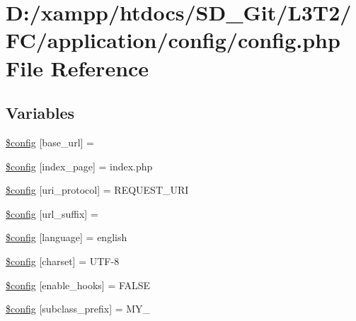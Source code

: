 \hypertarget{application_2config_2config_8php}{}\section{D\+:/xampp/htdocs/\+S\+D\+\_\+\+Git/\+L3\+T2/\+F\+C/application/config/config.php File Reference}
\label{application_2config_2config_8php}
\subsection*{Variables}
\begin{DoxyCompactItemize}
\item 
\hyperlink{application_2config_2config_8php_a8063081991a9d7087e6aea78db95a524}{\$config} \mbox{[}\textquotesingle{}base\+\_\+url\textquotesingle{}\mbox{]} = \textquotesingle{}\textquotesingle{}
\item 
\hyperlink{application_2config_2config_8php_a64d47dc21f6eab24bf747cae9da5e7bb}{\$config} \mbox{[}\textquotesingle{}index\+\_\+page\textquotesingle{}\mbox{]} = \textquotesingle{}index.\+php\textquotesingle{}
\item 
\hyperlink{application_2config_2config_8php_a37a0ed82a5db3c3aebdc12611e1e4498}{\$config} \mbox{[}\textquotesingle{}uri\+\_\+protocol\textquotesingle{}\mbox{]} = \textquotesingle{}R\+E\+Q\+U\+E\+S\+T\+\_\+\+U\+R\+I\textquotesingle{}
\item 
\hyperlink{application_2config_2config_8php_a40da61bb27389d4c21a1271840ec7c40}{\$config} \mbox{[}\textquotesingle{}url\+\_\+suffix\textquotesingle{}\mbox{]} = \textquotesingle{}\textquotesingle{}
\item 
\hyperlink{application_2config_2config_8php_ae05e29ba794fe4453013dd7b1cc30219}{\$config} \mbox{[}\textquotesingle{}language\textquotesingle{}\mbox{]} = \textquotesingle{}english\textquotesingle{}
\item 
\hyperlink{application_2config_2config_8php_ac9128ac0276b1b7acf4c96a22b2469f1}{\$config} \mbox{[}\textquotesingle{}charset\textquotesingle{}\mbox{]} = \textquotesingle{}U\+T\+F-\/8\textquotesingle{}
\item 
\hyperlink{application_2config_2config_8php_a2d80c3b160b2bb6f3329a9b07e970c51}{\$config} \mbox{[}\textquotesingle{}enable\+\_\+hooks\textquotesingle{}\mbox{]} = F\+A\+L\+S\+E
\item 
\hyperlink{application_2config_2config_8php_a51b79c9e455d64cb54212f2966b28ae6}{\$config} \mbox{[}\textquotesingle{}subclass\+\_\+prefix\textquotesingle{}\mbox{]} = \textquotesingle{}M\+Y\+\_\+\textquotesingle{}

\end{DoxyCompactItemize}

